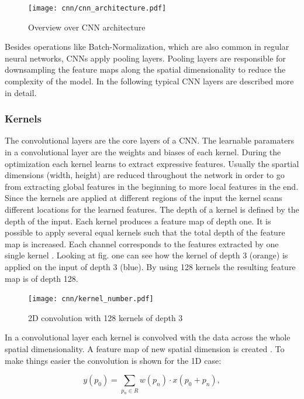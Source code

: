 \begin{figure}[htpb]
  \centering
  \texttt{[image: cnn/cnn\_architecture.pdf]}
  \caption {Overview over CNN architecture \cite{OShea2015}}
  \label{fig:CNN_overview}
\end{figure}
Besides operations like Batch-Normalization, which are also common in regular neural networks, CNNs apply pooling layers. Pooling layers are responsible for downsampling the feature maps along the spatial dimensionality to reduce the complexity of the model. In the following typical CNN layers are described more in detail. 


\subsubsection{Kernels}
The convolutional layers are the core layers of a CNN. The learnable paramaters in a convolutional layer are the weights and biases of each kernel. During the optimization each kernel learns to extract expressive features. Usually the spartial dimensions (width, height) are reduced throughout the network in order to go from extracting global features in the beginning to more local features in the end. Since the kernels are applied at different regions of the input the kernel scans different locations for the learned features. The depth of a kernel is defined by the depth of the input. Each kernel produces a feature map of depth one. It is possible to apply several equal kernels such that the total depth of the feature map is increased. Each channel corresponds to the features extracted by one single kernel \cite{OShea2015}. Looking at fig. \label{fig:kernel_number} one can see how the kernel of depth 3 (orange) is applied on the input of depth 3 (blue). By using 128 kernels the resulting feature map is of depth 128.

\begin{figure}[htpb]
  \centering
  \texttt{[image: cnn/kernel\_number.pdf]}
  \caption {2D convolution with 128 kernels of depth 3 \cite{Ganesh2019}}
  \label{fig:kernel_number}
\end{figure}
\FloatBarrier 

In a convolutional layer each kernel is convolved with the data across the whole spatial dimensionality. A feature map of new spatial dimension is created \cite{OShea2015}. To make things easier the convolution is shown for the 1D case:

\begin{equation}
  y(p_{0}) = \sum_{p_{n} \in R} w(p_{n}) \cdot x(p_{0} + p_{n}), 
  \label{eq:kernel}
\end{equation}

